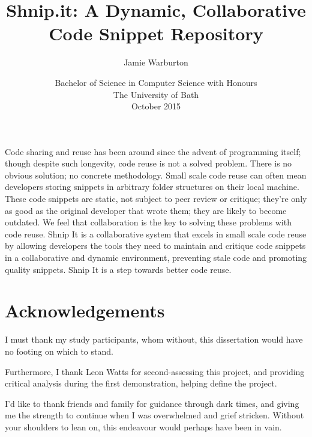 \documentclass[11pt,openright,a4paper]{report}
\title{Shnip.it: A Dynamic, Collaborative Code Snippet Repository}
\author{Jamie Warburton}
\date{Bachelor of Science in Computer Science with Honours\\The University of Bath\\October 2015}
\begin{document}
\lstset{language=Java,breaklines,breakatwhitespace,basicstyle=\small}


\setcounter{page}{0}


\maketitle
\newpage


\newpage


\newpage


\abstract
Code sharing and reuse has been around since the advent of programming itself; though despite such longevity, code reuse is not a solved problem. There is no obvious solution; no concrete methodology. Small scale code reuse can often mean developers storing snippets in arbitrary folder structures on their local machine. These code snippets are static, not subject to peer review or critique; they're only as good as the original developer that wrote them; they are likely to become outdated. We feel that collaboration is the key to solving these problems with code reuse. Shnip It is a collaborative system that excels in small scale code reuse by allowing developers the tools they need to maintain and critique code snippets in a collaborative and dynamic environment, preventing stale code and promoting quality snippets. Shnip It is a step towards better code reuse.
\newpage


\tableofcontents
\newpage
\listoffigures
\newpage
\listoftables
\newpage
\lstlistoflistings


\chapter*{Acknowledgements}
I must thank my study participants, whom without, this dissertation would have no footing on which to stand.

Furthermore, I thank Leon Watts for second-assessing this project, and providing critical analysis during the first demonstration, helping define the project.

I'd like to thank friends and family for guidance through dark times, and giving me the strength to continue when I was overwhelmed and grief stricken. Without your shoulders to lean on, this endeavour would perhaps have been in vain.
\end{document}
